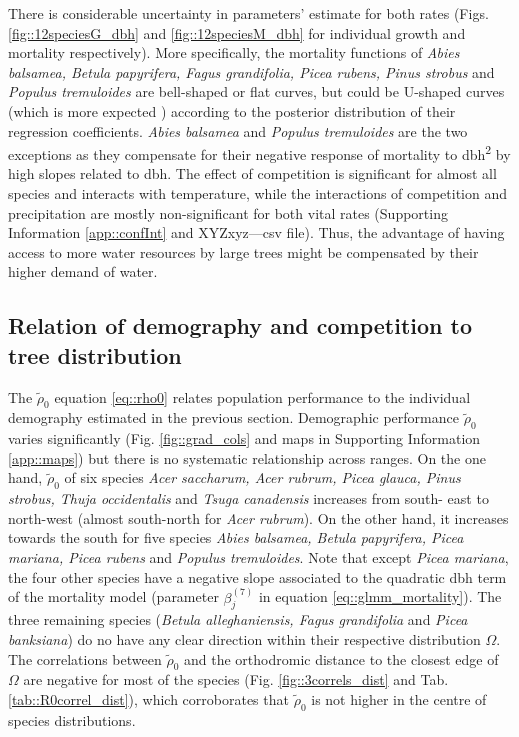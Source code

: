 There is considerable uncertainty in parameters' estimate for both rates (Figs. \ref{fig::12speciesG_dbh} and \ref{fig::12speciesM_dbh} for individual growth and mortality respectively). More specifically, the mortality functions of \textit{Abies balsamea, Betula papyrifera, Fagus grandifolia, Picea rubens, Pinus strobus} and \textit{Populus tremuloides} are bell-shaped or flat curves, but could be U-shaped curves (which is more expected \citep{Lines2010}) according to the posterior distribution of their regression coefficients. \textit{Abies balsamea} and \textit{Populus tremuloides} are the two exceptions as they compensate for their negative response of mortality to dbh\textsuperscript{2} by high slopes related to dbh. The effect of competition is significant for almost all species and interacts with temperature, while the interactions of competition and precipitation are mostly non-significant for both vital rates (Supporting Information \ref{app::confInt} and XYZxyz---csv file). Thus, the advantage of having access to more water resources by large trees might be compensated by their higher demand of water.

\subsection{Relation of demography and competition to tree distribution} %
The $ \tilde \rho_0 $ equation \eqref{eq::rho0} relates population performance to the individual demography estimated in the previous section. Demographic performance $ \tilde \rho_0 $ varies significantly (Fig. \ref{fig::grad_cols} and maps in Supporting Information \ref{app::maps}) but there is no systematic relationship across ranges. On the one hand, $ \tilde \rho_0 $ of six species \textit{Acer saccharum, Acer rubrum, Picea glauca, Pinus strobus, Thuja occidentalis} and \textit{Tsuga canadensis} increases from south- east to north-west (almost south-north for \textit{Acer rubrum}). On the other hand, it increases towards the south for five species \textit{Abies balsamea, Betula papyrifera, Picea mariana, Picea rubens} and \textit{Populus tremuloides}. Note that except \textit{Picea mariana}, the four other species have a negative slope associated to the quadratic dbh term of the mortality model (parameter $ \beta_j^{(7)} $ in equation \eqref{eq::glmm_mortality}). The three remaining species (\textit{Betula alleghaniensis, Fagus grandifolia} and \textit{Picea banksiana}) do no have any clear direction within their respective distribution $ \Omega $. The correlations between $ \tilde \rho_0 $ and the orthodromic distance to the closest edge of $ \Omega $ are negative for most of the species (Fig. \ref{fig::3correls_dist} and Tab. \ref{tab::R0correl_dist}), which corroborates that $ \tilde \rho_0 $ is not higher in the centre of species distributions.

